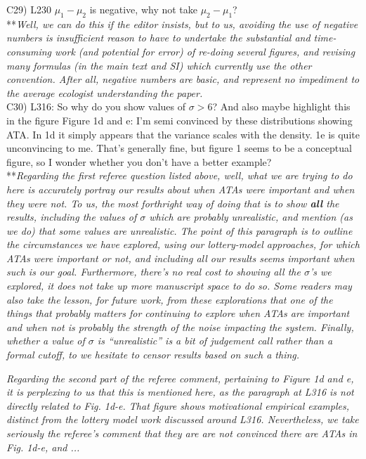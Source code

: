 \documentclass[letterpaper,11pt]{article}
\begin{document}
\noindent C29) L230 $\mu_1-\mu_2$ is negative, why not take $\mu_2-\mu_1$? \\

\noindent ***\emph{Well, we can do this if the editor insists, but to us, avoiding the use of
negative numbers is insufficient reason to have to undertake the substantial and time-consuming 
work (and potential for error) 
of re-doing several figures, and revising many formulas (in the main text and SI) which currently use the other convention.
After all, negative numbers are basic, and represent no impediment to the average ecologist understanding the 
paper.} \\

\noindent C30) L316: So why do you show values of $\sigma >6$? And also maybe highlight this in the figure Figure 1d and e: I’m semi convinced by these distributions showing ATA. In 1d it simply appears that the variance scales with the density. 1e is quite unconvincing to me. That’s generally fine, but figure 1 seems to be a conceptual figure, so I wonder whether you don’t have a better example? \\

\noindent ***\emph{Regarding the first referee question listed above, well, what we are 
trying to do here is accurately portray our results about
when ATAs were important and when they were not. To us, the most forthright way of doing that is to
show \textbf{all} the results, including the values of $\sigma$ which are probably unrealistic, and mention
(as we do) that some values are unrealistic. The point of this paragraph is to outline the circumstances
we have explored, using our lottery-model approaches, for which ATAs were important or not, and including all
our results seems important when such is our goal. Furthermore, there's no real cost to showing
all the $\sigma$'s we explored, it does not take up more manuscript space to do so.
Some readers may also take the lesson, for future work, from these explorations that one of the things that probably 
matters for continuing to explore when ATAs are important and when not is probably the strength
of the noise impacting the system. Finally, whether a value of $\sigma$ is ``unrealistic'' is 
a bit of judgement call rather than a formal cutoff, to we hesitate to censor results 
based on such a thing.}

\emph{Regarding the second part of the referee comment, pertaining to Figure 1d and e, it is perplexing to us that 
this is mentioned here,
as the paragraph at L316 is not directly related to Fig. 1d-e. That figure
shows motivational empirical examples, distinct from the lottery model work discussed around L316. Nevertheless, we take
seriously the referee's comment that they are are not convinced there are ATAs in Fig. 1d-e, and ...
} \\
\end{document}
